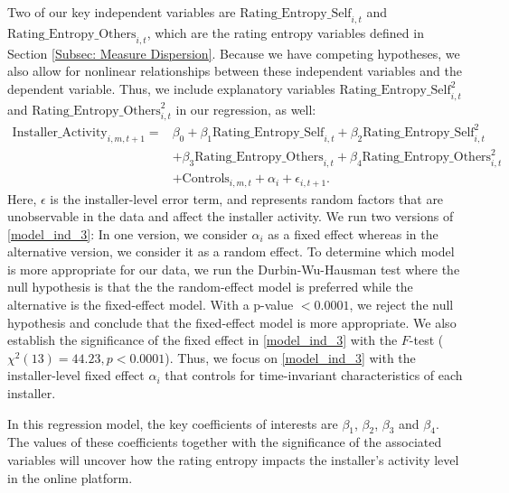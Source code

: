 \documentclass[msom,blindrev]{informs3}
\begin{document}
	Two of our key independent variables are $\text{Rating\_Entropy\_Self}_{i,t}$ and  $\text{Rating\_Entropy\_Others}_{i,t}$, which are the rating entropy variables defined in Section \ref{Subsec: Measure Dispersion}. Because we have competing hypotheses, we also allow for nonlinear relationships between these independent variables and the dependent variable. Thus, we include explanatory variables $\text{Rating\_Entropy\_Self}_{i,t}^{2}$ and $\text{Rating\_Entropy\_Others}_{i,t}^{2}$ in our regression, as well:
	\begin{align}  \nonumber
	\text{Installer\_Activity}_{i,m,t+1}=&\beta_{0}+\beta_{1} \text{Rating\_Entropy\_Self}_{i,t}+\beta_{2} \text{Rating\_Entropy\_Self}_{i,t}^ {2}
	\\ \nonumber
	&+\beta_{3} \text{Rating\_Entropy\_Others}_{i,t}  +\beta_{4}\text{Rating\_Entropy\_Others}_{i,t}^{2} \\ \label{model_ind_3}
	&+ \text{Controls}_{i,m,t}+ \alpha_{i} + \epsilon_{i,t+1}.
	\end{align}
	Here, $\epsilon$ is the installer-level error term, and represents random factors that are unobservable in the data and affect the installer activity.  We run two versions of \eqref{model_ind_3}: In one version, we consider $\alpha_{i}$ as a fixed effect whereas in the alternative version, we consider it as a random effect. To determine which model is more appropriate for our data, we run the Durbin-Wu-Hausman test where the null hypothesis is that the the random-effect model is preferred while the alternative is the fixed-effect model. With a p-value $<0.0001$, we reject the null hypothesis and conclude that the fixed-effect model is more appropriate. We also establish the significance of the fixed effect in \eqref{model_ind_3} with the $F$-test ($\chi^{2}(13)=44.23, p < 0.0001$). Thus, we focus on \eqref{model_ind_3} with the installer-level fixed effect $\alpha_{i}$ that controls for time-invariant characteristics of each installer.
	
	In this regression model, the key coefficients of interests are $\beta_{1}$, $\beta_{2}$, $\beta_{3}$ and $\beta_{4}$. The values of these coefficients together with the significance of the associated variables will uncover how the rating entropy impacts the installer's activity level in the online platform.
	
\end{document}

